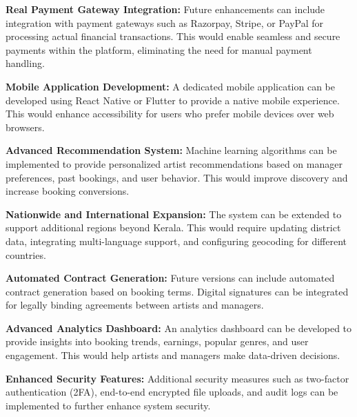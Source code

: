 \documentclass[12pt,a4paper]{report}
\begin{document}
\textbf{Real Payment Gateway Integration:}
Future enhancements can include integration with payment gateways such as Razorpay, Stripe, or PayPal for processing actual financial transactions. This would enable seamless and secure payments within the platform, eliminating the need for manual payment handling.

\vspace{0.3cm}

\textbf{Mobile Application Development:}
A dedicated mobile application can be developed using React Native or Flutter to provide a native mobile experience. This would enhance accessibility for users who prefer mobile devices over web browsers.

\vspace{0.3cm}

\textbf{Advanced Recommendation System:}
Machine learning algorithms can be implemented to provide personalized artist recommendations based on manager preferences, past bookings, and user behavior. This would improve discovery and increase booking conversions.

\vspace{0.3cm}

\textbf{Nationwide and International Expansion:}
The system can be extended to support additional regions beyond Kerala. This would require updating district data, integrating multi-language support, and configuring geocoding for different countries.

\vspace{0.3cm}

\textbf{Automated Contract Generation:}
Future versions can include automated contract generation based on booking terms. Digital signatures can be integrated for legally binding agreements between artists and managers.

\vspace{0.3cm}

\textbf{Advanced Analytics Dashboard:}
An analytics dashboard can be developed to provide insights into booking trends, earnings, popular genres, and user engagement. This would help artists and managers make data-driven decisions.

\vspace{0.3cm}

\textbf{Enhanced Security Features:}
Additional security measures such as two-factor authentication (2FA), end-to-end encrypted file uploads, and audit logs can be implemented to further enhance system security.

\vspace{0.3cm}
\end{document}
